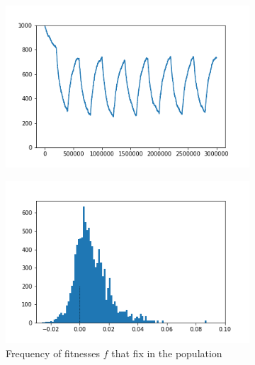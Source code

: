 \documentclass{article}
\begin{document}
\begin{figure}[h]
	\centering
	\begin{subfigure}[t]{0.32\linewidth}
		\centering
		\includegraphics[width = 1.0\linewidth, trim={0 0 0 0}, clip=true]{figures/changing_selection_trajec.png}
		\label{fig:changing_constant_trajec}	
	\end{subfigure}
	\hspace{0.01\linewidth}
	\begin{subfigure}[t]{0.32\linewidth}
		\centering
		\includegraphics[width = 1.0\linewidth, trim={0 0 0 0}, clip=true]{figures/changing_selection_hist2.png}
		\caption{Frequency of fitnesses $f$ that fix in the population}
		\label{fig:changing_constant_hist}
	\end{subfigure}
	\begin{subfigure}[t]{0.32\linewidth}
		\centering

\end{subfigure}
\end{figure}
\end{document}
